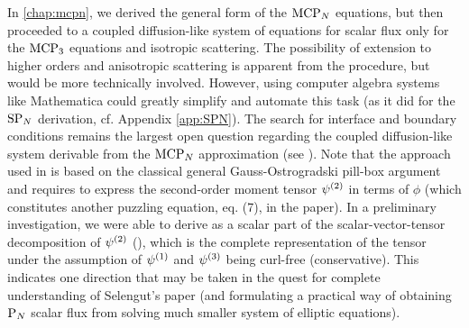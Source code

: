 \documentclass[twoside, 12pt]{thesis}
\begin{document}
In \cref{chap:mcpn}, we derived the general form of the $\MCPN$ equations, but then proceeded to a coupled
diffusion-like system of equations for scalar flux only for the $\MCPN[3]$ equations and isotropic scattering. The
possibility of extension to higher orders and anisotropic scattering is apparent from the procedure, but would be more
technically involved. However, using computer algebra systems like Mathematica could greatly simplify and automate this
task (as it did for the $\SPN$ derivation, cf. Appendix \ref{app:SPN}). The search for interface and boundary conditions
remains the largest open question regarding the coupled diffusion-like system derivable from the $\MCPN$
approximation (see ). Note that the approach used in \cite{Selengut} is based on the
classical general Gauss-Ostrogradski pill-box argument and requires to express the second-order moment tensor
$\fmom[2]$ in terms of $\phi$ (which constitutes another puzzling equation, eq. (7), in the paper). In a preliminary investigation,
we were able to derive \cite[Eq. (7)]{Selengut} as a scalar part of the scalar-vector-tensor decomposition of $\fmom[2]$
(\cite{Clarkson}), which is the complete representation of the tensor under the assumption of $\fmom[1]$ and $\fmom[3]$ 
being curl-free (conservative). This indicates one direction that may be taken in the quest for complete understanding
of Selengut's paper (and formulating a practical way of obtaining $\PN$ scalar flux from solving much smaller system of
elliptic equations).
\end{document}
